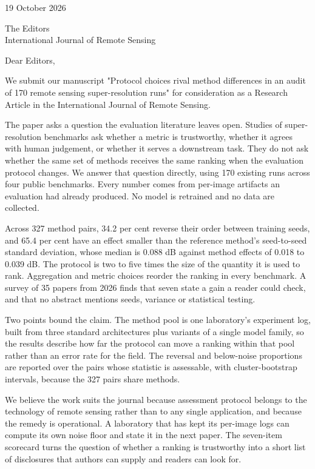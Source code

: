 \documentclass[11pt]{article}
\begin{document}
19 October 2026

The Editors\\
International Journal of Remote Sensing

Dear Editors,

We submit our manuscript "Protocol choices rival method differences in an audit of 170 remote sensing super-resolution runs" for consideration as a Research Article in the International Journal of Remote Sensing.

The paper asks a question the evaluation literature leaves open. Studies of super-resolution benchmarks ask whether a metric is trustworthy, whether it agrees with human judgement, or whether it serves a downstream task. They do not ask whether the same set of methods receives the same ranking when the evaluation protocol changes. We answer that question directly, using 170 existing runs across four public benchmarks. Every number comes from per-image artifacts an evaluation had already produced. No model is retrained and no data are collected.

Across 327 method pairs, 34.2 per cent reverse their order between training seeds, and 65.4 per cent have an effect smaller than the reference method's seed-to-seed standard deviation, whose median is 0.088 dB against method effects of 0.018 to 0.039 dB. The protocol is two to five times the size of the quantity it is used to rank. Aggregation and metric choices reorder the ranking in every benchmark. A survey of 35 papers from 2026 finds that seven state a gain a reader could check, and that no abstract mentions seeds, variance or statistical testing.

Two points bound the claim. The method pool is one laboratory's experiment log, built from three standard architectures plus variants of a single model family, so the results describe how far the protocol can move a ranking within that pool rather than an error rate for the field. The reversal and below-noise proportions are reported over the pairs whose statistic is assessable, with cluster-bootstrap intervals, because the 327 pairs share methods.

We believe the work suits the journal because assessment protocol belongs to the technology of remote sensing rather than to any single application, and because the remedy is operational. A laboratory that has kept its per-image logs can compute its own noise floor and state it in the next paper. The seven-item scorecard turns the question of whether a ranking is trustworthy into a short list of disclosures that authors can supply and readers can look for.
\end{document}
